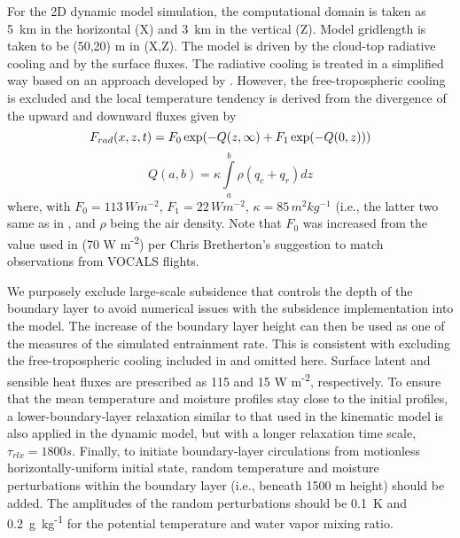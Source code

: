 \documentclass{article}
\begin{document}
  For the 2D dynamic model simulation, the computational domain is taken as 
    5~km in the horizontal (X) and 3~km in the vertical (Z).
   Model gridlength is taken to be (50,20) m in (X,Z). 
  The model is driven by the cloud-top radiative cooling and by the surface fluxes. 
  The radiative cooling is treated in a simplified way based on an approach developed 
    by \citet[][eqs. 3 and 4 in particular]{Stevens_et_al_2005}.  
  However, the free-tropospheric cooling is excluded and the local temperature tendency
    is derived from the divergence of the upward and downward fluxes given by
    \begin{equation*}
      F_{rad}(x,z,t) = F_0\,{\rm exp}(-Q(z, \infty) + F_1\,{\rm exp}(-Q(0,z)))
    \end{equation*}
    \begin{equation*}
      Q(a,b) = \kappa \int\limits_a^b \rho (q_c + q_r) dz
    \end{equation*}
    where, with $F_0 = 113 \,W m^{-2}$, $F_1 = 22 \,W m^{-2}$, $\kappa = 85 \,m^2 kg^{-1}$ 
    (i.e., the latter two same as in \citet{Stevens_et_al_2005}, and $\rho$ being 
    the air density. 
  Note that $F_0$ was increased from the value used in \citet{Stevens_et_al_2005} 
    (70 W m\textsuperscript{-2}) per Chris Bretherton's suggestion to match 
    observations from VOCALS flights.

  We purposely exclude large-scale subsidence that controls the depth of the boundary 
    layer to avoid numerical issues with the subsidence implementation into the model. 
  The increase of the boundary layer height can then be used as one of the measures 
    of the simulated entrainment rate. 
  This is consistent with excluding the free-tropospheric cooling included in 
    \citet{Stevens_et_al_2005} and omitted here. 
  Surface latent and sensible heat fluxes are prescribed as 115 and 15 W m\textsuperscript{-2}, 
    respectively. 
  To ensure that the mean temperature and moisture profiles stay close to the initial profiles, 
    a lower-boundary-layer relaxation similar to that used in the kinematic model is also applied 
    in the dynamic model, but with a longer relaxation time scale, $\tau_{rlx} = 1800 s$. 
  Finally, to initiate boundary-layer circulations from motionless horizontally-uniform initial 
    state, random temperature and moisture perturbations within the boundary layer 
    (i.e., beneath 1500 m height) should be added. 
  The amplitudes of the random perturbations should be 0.1~K and 0.2~g~kg\textsuperscript{-1}
    for the potential temperature and water vapor mixing ratio.
\end{document}
